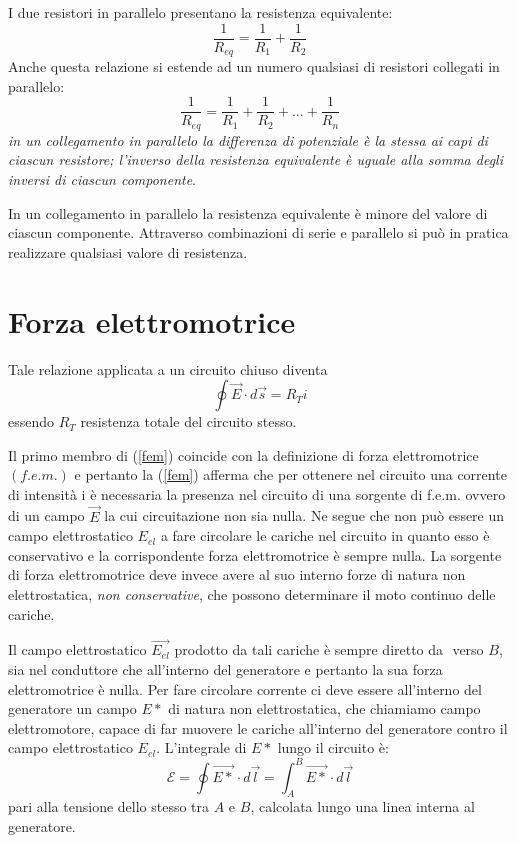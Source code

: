 \documentclass[class=book, crop=false, oneside, 12pt]{standalone}
\begin{document}
I due resistori in parallelo presentano la resistenza equivalente: 
\begin{equation*}
    \frac{1}{R_{eq}} = \frac{1}{R_1} + \frac{1}{R_2}
\end{equation*}
Anche questa relazione si estende ad un numero qualsiasi di resistori collegati in parallelo: 
\begin{equation}
    \frac{1}{R_{eq}} = \frac{1}{R_1} + \frac{1}{R_2} + ... + \frac{1}{R_n}
\end{equation}
\emph{in un collegamento in parallelo la differenza di potenziale è la stessa ai capi di ciascun resistore; l'inverso della resistenza equivalente è uguale alla somma degli inversi di ciascun componente}.

In un collegamento in parallelo la resistenza equivalente è minore del valore di ciascun componente.  
Attraverso combinazioni di serie e parallelo si può in pratica realizzare qualsiasi valore di resistenza.

\section{Forza elettromotrice}

Tale relazione applicata a un circuito chiuso diventa
\begin{equation} \label{fem}
    \oint \overrightarrow{E} \cdot d \overrightarrow{s} = R_T i 
\end{equation}
essendo \(R_T\) resistenza totale del circuito stesso.

Il primo membro di (\ref{fem}) coincide con la definizione di forza elettromotrice \((f.e.m.)\) e pertanto la (\ref{fem}) afferma che per ottenere nel circuito una corrente di intensità i è necessaria la presenza nel circuito di una sorgente di f.e.m. ovvero di un campo \(\overrightarrow{E}\) la cui circuitazione non sia nulla. 
Ne segue che non può essere un campo elettrostatico \(E_{el}\) a fare circolare le cariche nel circuito in quanto esso è conservativo e la corrispondente forza elettromotrice è sempre nulla. 
La sorgente di forza elettromotrice deve invece avere al suo interno forze di natura non elettrostatica, \emph{non conservative}, che possono determinare il moto continuo delle cariche. 

Il campo elettrostatico \(\overrightarrow{E_{el}}\) prodotto da tali cariche è sempre diretto da \(\) verso \(B\), sia nel conduttore che all'interno del generatore e pertanto la sua forza elettromotrice è nulla. 
Per fare circolare corrente ci deve essere all'interno del generatore un campo \( E*\) di natura non elettrostatica, che chiamiamo campo elettromotore, capace di far muovere le cariche all'interno del generatore contro il campo elettrostatico \(E_{el}\).
L'integrale di \(E*\) lungo il circuito è: 
\begin{equation}
    \mathcal{E} = \oint \overrightarrow{E*} \cdot d \overrightarrow{l} = \int_A^B \overrightarrow{E*} \cdot d \overrightarrow{l}
\end{equation}
pari alla tensione dello stesso tra \(A\) e \(B\), calcolata lungo una linea interna al generatore.
\end{document}
